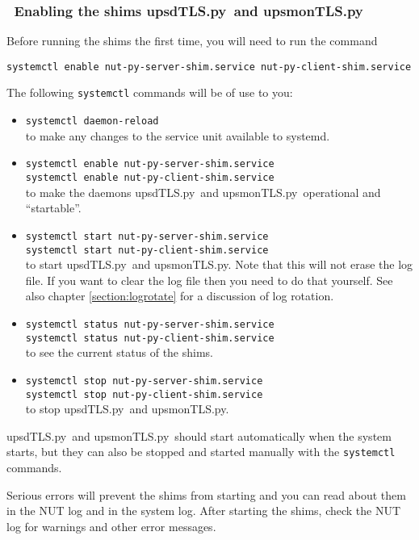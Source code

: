 \documentclass[12pt]{article}
\newlength{\headersep}\setlength{\headersep}{3mm}
\newcommand{\Hsep}{\hspace{\headersep}}
\newcommand{\newcolumn}{\vfill\eject}
\newcommand{\upsdTLS}{\mbox{\textcolor{UPSDCOLOUR}{upsdTLS.py}}}
\newcommand{\upsmonTLS}{\mbox{\textcolor{UPSMONCOLOUR}{upsmonTLS.py}}}
\newcommand{\ul}{\begin{itemize}%
   \setlength{\itemsep}{0em}}
\newcommand{\eul}{\end{itemize}}
\newcommand{\li}{\item}                 %
\begin{document}
\newcolumn
\subsubsection{\Hsep\ Enabling the shims \upsdTLS\ and \upsmonTLS}\label{section:UPenable}

Before running the shims the first time, you will need to run the
command
\begin{verbatim}
systemctl enable nut-py-server-shim.service nut-py-client-shim.service
\end{verbatim}

The following \texttt{systemctl} commands will be of use to you:

\ul

\li \texttt{systemctl daemon-reload} \\
to make any changes to the service unit available to systemd.

\li \texttt{systemctl enable nut-py-server-shim.service} \\
\texttt{systemctl enable nut-py-client-shim.service} \\
to make the daemons
\upsdTLS\ and \upsmonTLS\ operational and ``startable''.

\li \texttt{systemctl start nut-py-server-shim.service} \\
\texttt{systemctl start nut-py-client-shim.service} \\
to start \upsdTLS\ and
\upsmonTLS.  Note that this will not erase the log file.  If you want to clear
the log file then you need to do that yourself.  See also chapter
\ref{section:logrotate} for a discussion of log rotation.

\li \texttt{systemctl status nut-py-server-shim.service} \\
\texttt{systemctl status nut-py-client-shim.service} \\
to see the current status of the shims.

\li \texttt{systemctl stop nut-py-server-shim.service} \\
\texttt{systemctl stop nut-py-client-shim.service} \\
to stop \upsdTLS\ and \upsmonTLS.

\eul

\upsdTLS\ and \upsmonTLS\ should start automatically when the system starts,
but they can also be stopped and started manually with the \texttt{systemctl}
commands.

Serious errors will prevent the shims from starting and you can read about
them in the NUT log and in the system log.  After starting the shims, check
the NUT log for warnings and other error messages.
\end{document}
